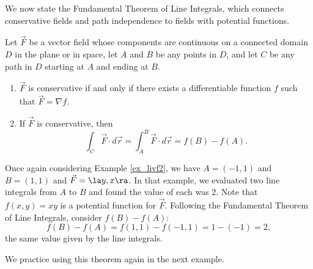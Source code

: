 We now state the Fundamental Theorem of Line Integrals, which connects conservative fields and path independence to fields with potential functions. 

{Let $\vec F$ be a vector field whose components are continuous on a connected domain $D$ in the plane or in space, let $A$ and $B$ be any points in $D$, and let $C$ be any path in $D$ starting at $A$ and ending at $B$.
\begin{enumerate}
	\item $\vec F$ is conservative if and only if there exists a differentiable function $f$ such that $\vec F = \nabla f$. 
	\item	If $\vec F$ is conservative, then 
	$$\int_C\vec F\cdot d\vec r = \int_A^B \vec F\cdot d\vec r = f(B) - f(A).$$
\end{enumerate}
}

Once again considering Example \ref{ex_livf2}, we have $A = (-1,1)$ and $B = (1,1)$ and $\vec F = \la y,x\ra$. In that example, we evaluated two line integrals from $A$ to $B$ and found the value of each was 2. Note that $f(x,y) = xy$ is a potential function for $\vec F$. Following the Fundamental Theorem of Line Integrals, consider $f(B) - f(A)$:
$$f(B) - f(A) = f(1,1) - f(-1,1) = 1 - (-1) = 2,$$
the same value given by the line integrals.

We practice using this theorem again in the next example.\\

